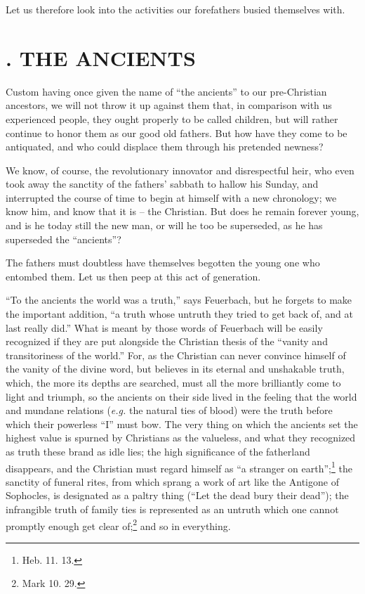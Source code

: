 \documentclass[12pt,a4paper]{book}
\begin{document}
Let us therefore look into the activities our forefathers busied themselves 
with.

\medskip{}

\section[1. The Ancients]{. THE ANCIENTS}

Custom having once given the name of ``the ancients'' to our pre-Christian 
ancestors, we will not throw it up against them that, in comparison with us 
experienced people, they ought properly to be called children, but will rather 
continue to honor them as our good old fathers. But how have they come to be 
antiquated, and who could displace them through his pretended newness?

We know, of course, the revolutionary innovator and disrespectful heir, who 
even took away the sanctity of the fathers' sabbath to hallow his Sunday, and 
interrupted the course of time to begin at himself with a new chronology; we 
know him, and know that it is -- the Christian. But does he remain forever 
young, and is he today still the new man, or will he too be superseded, as he 
has superseded the ``ancients''?

The fathers must doubtless have themselves begotten the young one who entombed 
them. Let us then peep at this act of generation.

``To the ancients the world was a truth,'' says Feuerbach, but he forgets to 
make the important addition, ``a truth whose untruth they tried to get back 
of, and at last really did.'' What is meant by those words of Feuerbach will 
be easily recognized if they are put alongside the Christian thesis of the 
``vanity and transitoriness of the world.'' For, as the Christian can never 
convince himself of the vanity of the divine word, but believes in its eternal 
and unshakable truth, which, the more its depths are searched, must all the 
more brilliantly come to light and triumph, so the ancients on their side 
lived in the feeling that the world and mundane relations (\textit{e.g.} the 
natural ties of blood) were the truth before which their powerless ``I'' 
must bow. The very thing on which the ancients set the highest value is 
spurned by Christians as the valueless, and what they recognized as truth 
these brand as idle lies; the high significance of the fatherland disappears, 
and the Christian must regard himself as ``a stranger on 
earth'';\footnote{Heb. 11. 13.} the sanctity of funeral rites, from which 
sprang a work of art like the Antigone of Sophocles, is designated as a paltry 
thing (``Let the dead bury their dead''); the infrangible truth of family 
ties is represented as an untruth which one cannot promptly enough get clear 
of;\footnote{Mark 10. 29.} and so in everything.
\end{document}
